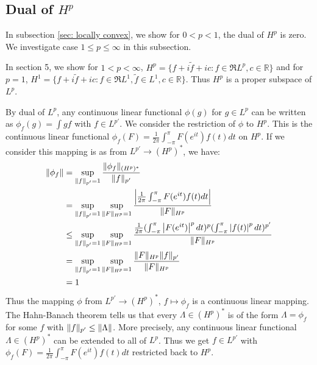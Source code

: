 \subsection{Dual of $H^p$}
In subsection \ref{sec: locally convex}, we show for $0<p<1$, the dual of $H^p$ is zero. We investigate case $1\leq p\leq \infty$ in this subsection.\par
In section 5, we show for $1<p<\infty$, $ H^p=\{f+i\tilde{f}+i c:f\in\Re{L^p}, c\in\mathbb{R}\}$ and for $p=1$, $H^1=\{f+i\tilde{f}+i c:f\in\Re{L^1},\tilde{f}\in{L^1}, c\in\mathbb{R}\}$.
Thus $H^p$ is a proper subspace of $L^p$.\par
By dual of $L^p$, any continuous linear functional $\phi(g)$ for $g\in L^p$ can be written as $\phi_f(g)=\int{gf}$ with $f\in L^{p'}$. We consider the restriction of $\phi$ to $H^p$. This is
the continuous linear functional $\phi_f(F)=\frac{1}{2\pi}\int_{-\pi}^{\pi}{F(e^{it})f(t)d t}$ on $H^p$. If we consider this mapping is as from $L^{p'}\to (H^p)^*$, we have:
\begin{align*}
    \lVert\phi_f\rVert & =\sup_{\lVert f\rVert_{p'}=1}\frac{\lVert\phi_f\rVert_{(H^p)^*}}{\lVert f\rVert_{p'}}                                                                                                       \\
                  & =\sup_{\lVert f\rVert_{p'}=1}\sup_{\lVert F\rVert_{H^p}=1}\frac{\left\lvert\frac{1}{2\pi}\int_{-\pi}^{\pi}{F(e^{it})f(t)d t}\right\rvert}{\lVert F\rVert_{H^p}}                                               \\
                  & \leq\sup_{\lVert f\rVert_{p'}=1}\sup_{\lVert F\rVert_{H^p}=1}\frac{\frac{1}{2\pi}(\int_{-\pi}^{\pi}{\left\lvert F(e^{it})\right\rvert^p d t})^p(\int_{-\pi}^{\pi}\left\lvert f(t)\right\rvert^p d t)^{p'}}{\lVert F\rVert_{H^p}} \\
                  & =\sup_{\lVert f\rVert_{p'}=1}\sup_{\lVert F\rVert_{H^p}=1}\frac{\lVert F\rVert_{H^p}\lVert f\rVert_{p'}}{\lVert F\rVert_{H^p}}                                                                           \\
                  & =1
\end{align*}
Thus the mapping $\phi$ from $L^{p'}\to (H^p)^*$, $f\mapsto\phi_f$ is a continuous linear mapping. The Hahn-Banach theorem tells us that every $\Lambda\in (H^p)^*$ is of the form $\Lambda=\phi_f$
for some $f$ with $\lVert f\rVert_{p'}\leq\lVert\Lambda\rVert$. More precisely, any continuous linear functional $\Lambda\in (H^p)^*$ can be extended to all of $L^p$. Thus we get $f\in L^{p'}$ with
$\phi_f(F)=\frac{1}{2\pi}\int_{-\pi}^{\pi}{F(e^{it})f(t)d t}$ restricted back to $H^p$.\par

